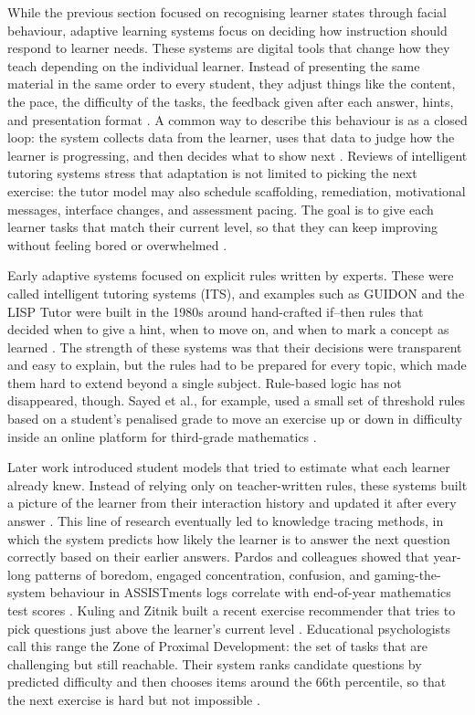 While the previous section focused on recognising learner states through facial behaviour, adaptive learning systems focus on deciding how instruction should respond to learner needs. These systems are digital tools that change how they teach depending on the individual learner. Instead of presenting the same material in the same order to every student, they adjust things like the content, the pace, the difficulty of the tasks, the feedback given after each answer, hints, and presentation format \cite{strielkowski_span_2025}. A common way to describe this behaviour is as a closed loop: the system collects data from the learner, uses that data to judge how the learner is progressing, and then decides what to show next \cite{gligorea_adaptive_2023}. Reviews of intelligent tutoring systems stress that adaptation is not limited to picking the next exercise: the tutor model may also schedule scaffolding, remediation, motivational messages, interface changes, and assessment pacing. The goal is to give each learner tasks that match their current level, so that they can keep improving without feeling bored or overwhelmed \cite{zerkouk_comprehensive_2025}.

Early adaptive systems focused on explicit rules written by experts. These were called intelligent tutoring systems (ITS), and examples such as GUIDON and the LISP Tutor were built in the 1980s around hand-crafted if--then rules that decided when to give a hint, when to move on, and when to mark a concept as learned . The strength of these systems was that their decisions were transparent and easy to explain, but the rules had to be prepared for every topic, which made them hard to extend beyond a single subject. Rule-based logic has not disappeared, though. Sayed et al., for example, used a small set of threshold rules based on a student's penalised grade to move an exercise up or down in difficulty inside an online platform for third-grade mathematics \cite{sayed_ai-based_2023}.

Later work introduced student models that tried to estimate what each learner already knew. Instead of relying only on teacher-written rules, these systems built a picture of the learner from their interaction history and updated it after every answer \cite{zerkouk_comprehensive_2025}. This line of research eventually led to knowledge tracing methods, in which the system predicts how likely the learner is to answer the next question correctly based on their earlier answers. Pardos and colleagues showed that year-long patterns of boredom, engaged concentration, confusion, and gaming-the-system behaviour in ASSISTments logs correlate with end-of-year mathematics test scores \cite{Pardos2014AffectiveStatesStateTests}. Kuling and Zitnik built a recent exercise recommender that tries to pick questions just above the learner's current level \cite{kuling_ken_2025}. Educational psychologists call this range the Zone of Proximal Development: the set of tasks that are challenging but still reachable. Their system ranks candidate questions by predicted difficulty and then chooses items around the 66th percentile, so that the next exercise is hard but not impossible \cite{kuling_ken_2025}.

